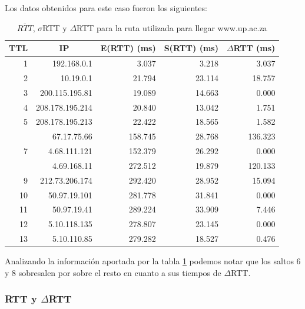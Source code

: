 Los datos obtenidos para este caso fueron los siguientes:

\begin{table}[H]
    \begin{center}
        \begin{tabular}{| r | r | r | r | r |}
  \hline
  {\bf TTL} & \multicolumn{1}{|c|}{\bf IP} & {\bf E(RTT) (ms)} & {\bf S(RTT) (ms)} & {\bf $\Delta$RTT (ms)}\\
  \hline 
\hline 1  & 192.168.0.1 &  3.037 & 3.218 & 3.037\\
\hline 2  & 10.19.0.1 & 21.794 & 23.114 & 18.757\\
\hline 3  & 200.115.195.81 & 19.089 & 14.663 & 0.000\\
\hline 4  & 208.178.195.214 & 20.840 & 13.042 & 1.751\\ 
\hline 5  & 208.178.195.213 & 22.422 & 18.565 & 1.582\\ 
\rowcolor{blue!25}\hline 6  & 67.17.75.66 & 158.745 & 28.768 & 136.323\\ 
\hline 7  & 4.68.111.121 &  152.379 & 26.292 & 0.000\\ 
\rowcolor{blue!25}\hline 8  & 4.69.168.11 & 272.512 & 19.879 & 120.133\\ 
\hline 9  & 212.73.206.174 & 292.420 & 28.952 & 15.094\\ 
\hline 10  & 50.97.19.101 & 281.778 & 31.841 & 0.000\\ 
\hline 11  & 50.97.19.41 & 289.224 & 33.909 & 7.446\\ 
\hline 12  & 5.10.118.135 & 278.807 & 23.145 & 0.000\\ 
\hline 13  & 5.10.110.85 & 279.282 & 18.527 & 0.476\\ 
\hline
        \end{tabular}
        \caption{$\overline{RTT}$, $\sigma$RTT y $\Delta$RTT para la ruta utilizada para llegar www.up.ac.za}
        \label{table:pretoria} 
    \end{center}
\end{table}

Analizando la información aportada por la tabla \ref{table:pretoria} podemos notar que los saltos 6 y 8 sobresalen por sobre el resto en cuanto a sus tiempos de $\Delta$RTT. 

\subsubsection{RTT y $\Delta$RTT}

